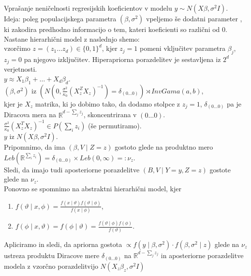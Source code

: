 \documentclass[a4paper, 12pt]{book}
\theoremstyle{definition}
\theoremstyle{remark}
\newcommand{\R}{\mathbb{R}}
\begin{document}

Vprašanje neničelnosti regresijskih koeficientov v  modelu $y \sim N(X \beta, \sigma^2 I)$. \\
Ideja: poleg populacijskega parametra $(\beta, \sigma^2)$ vpeljemo še dodatni parameter \sn{$\phi$},
ki zakodira predhodno informacijo o tem, kateri koeficienti so različni od 0. \\
Nastane hierarhični model z naslednjo shemo: \\
vzorčimo $z = (z_1 \dots z_d) \in \{0, 1\}^d$, kjer $z_j = 1$ pomeni vključitev parametra $\beta_j$,
$z_j = 0$ pa njegovo izključitev.
Hiperapriorna porazdelitev je sestavljena iz $2^d$ verjetnosti. \\
$y \approx X_1 \beta_1 + \dots + X_d \beta_d$. \\
$(\beta, \sigma^2)$ iz $\left(N\left(0, \frac{\sigma^2}{\kappa_0} (X_z^Z X_z)^{-1}\right) = \delta_{(0 \dots 0)}\right)
\rtimes InvGama(a, b)$, \\
kjer je $X_z$ matrika, ki jo dobimo tako, da dodamo stolpce z $z_j = 1$,
$\delta_{(0 \dots 0)}$ pa je Diracova mera na $\R^{d - \sum_j z_j}$, skoncentrirana v $(0 \dots 0)$. \\
$\frac{\sigma^2}{\kappa_0} (X_z^T X_z)^{-1} \in P\left(\sum_i z_i\right)$ (še permutiramo). \\
$y$ iz $N(X \beta, \sigma^2 I)$. \\
Pripomnimo, da ima $(\beta, V \mid Z=z)$ gostoto glede na produktno mero
$Leb\left(\R^{\sum_i z_i}\right) = \delta_{(0 \dots 0)} \times Leb(0, \infty) =: \nu_z$. \\
Sledi, da imajo tudi aposteriorne porazdelitve $(B, V \mid Y=y, Z=z)$ gostote glede na $\nu_z$. \\
Ponovno se spomnimo na abstraktni hierarhični model, kjer
\begin{enumerate}[label=(\arabic*)]
  \item $f(\vartheta \mid x, \phi) = \frac{f(x \mid \vartheta) f(\vartheta \mid \phi)}{f(x \mid \phi)}$,
  \item $f(\phi \mid x, \vartheta) = f(\phi \mid \vartheta) = \frac{f(\vartheta \mid \phi) f(\phi)}{f(\vartheta)}$.
\end{enumerate}
Apliciramo in sledi, da apriorna gostota $\propto f(y \mid \beta, \sigma^2) \cdot f(\beta, \sigma^2 \mid z)$
glede na $\nu_z$ ustreza produktu Diracove mere $\delta_{(0 \dots 0)}$ na $\R^{d - \sum_j z_j}$
in aposteriorne porazdelitve modela z vzorčno porazdelitvijo $N(X_z \beta_z, \sigma^2 I)$
\end{document}
